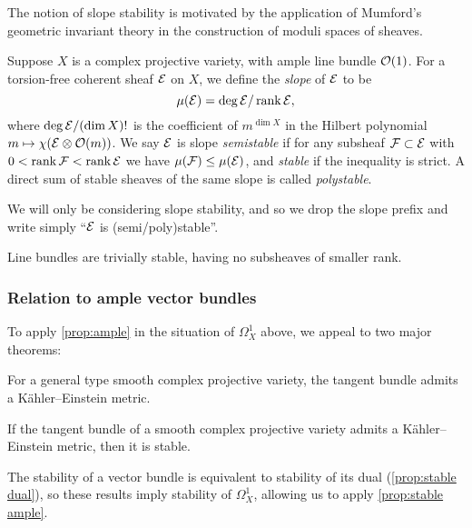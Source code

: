 The notion of slope stability is motivated by the application of Mumford's
geometric invariant theory in the construction of moduli spaces of sheaves.

\begin{definition}
    Suppose $X$ is a complex projective variety, with ample line bundle $\mathcal{O}(1)$.
    For a torsion-free coherent sheaf $\mathcal{E}$ on $X$, we define the \emph{slope}
    of $\mathcal{E}$ to be
    \begin{equation*}
        \mu(\mathcal{E}) = \deg\mathcal{E} / \operatorname{rank}\mathcal{E},
    \end{equation*}
    where $\deg\mathcal{E}/(\dim X)!$ is the coefficient of $m^{\dim X}$ in the
    Hilbert polynomial $m\mapsto\chi(\mathcal{E}\otimes\mathcal{O}(m))$. We say $\mathcal{E}$ is
    slope \emph{semistable} if for any subsheaf $\mathcal{F}\subset\mathcal{E}$ with
    $0<\operatorname{rank}\mathcal{F}<\operatorname{rank}\mathcal{E}$ we have $\mu(\mathcal{F})\le\mu(\mathcal{E})$, and
    \emph{stable} if the inequality is strict. A direct sum of stable sheaves of
    the same slope is called \emph{polystable}.
\end{definition}

We will only be considering slope stability, and so we drop the slope prefix and
write simply ``$\mathcal{E}$ is (semi/poly)stable''. 

\begin{remark}
    Line bundles are trivially stable, having no subsheaves of smaller rank.
\end{remark}

\subsubsection{Relation to ample vector bundles}

To apply \cref{prop:ample} in the situation of $\Omega^1_X$ above, we appeal to
two major theorems:

\begin{theorem}
    For a general type smooth complex projective variety, the tangent bundle
    admits a K\"ahler--Einstein metric.
\end{theorem}

\begin{theorem}
    If the tangent bundle of a smooth complex projective variety admits a
    K\"ahler--Einstein metric, then it is stable.
\end{theorem}

The stability of a vector bundle is equivalent to stability of its dual
(\cref{prop:stable dual}), so these results imply stability of $\Omega^1_X$,
allowing us to apply \cref{prop:stable ample}.

